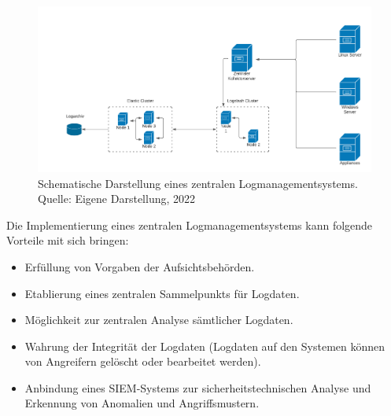 \begin{figure}[H]
    \centering
  \includegraphics[scale=0.2]{images/uploads/a_figure_10.png}
  \caption{Schematische Darstellung eines zentralen Logmanagementsystems. Quelle: Eigene Darstellung, 2022}
  \label{fig:best-practice logmanagement}
\end{figure}
\bigbreak
Die Implementierung eines zentralen Logmanagementsystems kann folgende Vorteile mit sich bringen:
\begin{itemize}
    \item Erfüllung von Vorgaben der Aufsichtsbehörden.
    \item Etablierung eines zentralen Sammelpunkts für Logdaten.
    \item Möglichkeit zur zentralen Analyse sämtlicher Logdaten.
    \item Wahrung der Integrität der Logdaten (Logdaten auf den Systemen können von Angreifern gelöscht oder bearbeitet werden).
    \item Anbindung eines SIEM-Systems zur sicherheitstechnischen Analyse und Erkennung von Anomalien und Angriffsmustern.
\end{itemize}

